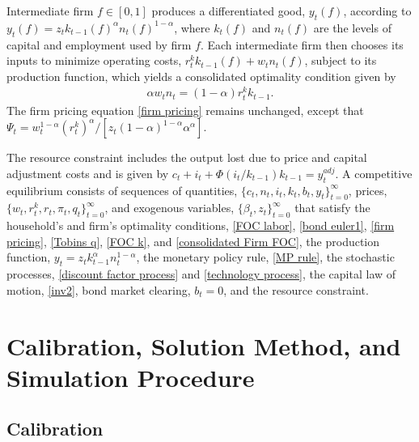 \documentclass[12pt,final]{article}
\begin{document}
Intermediate firm $f\in[0,1]$ produces a differentiated good, $y_t(f)$, according to $y_t(f)=z_tk_{t-1}(f)^{\alpha}n_t(f)^{1-\alpha}$, where $k_t(f)$ and $n_t(f)$ are the levels of capital and employment used by firm $f$. Each intermediate firm then chooses its inputs to minimize operating costs, $r_t^kk_{t-1}(f)+w_tn_t(f)$, subject to its production function, which yields a consolidated optimality condition given by
\begin{gather}
  \alpha w_tn_t = (1-\alpha)r_t^kk_{t-1}. \label{consolidated Firm FOC}
\end{gather}
The firm pricing equation \eqref{firm pricing} remains unchanged, except that $\Psi_t=w_t^{1-\alpha}(r_t^k)^{\alpha}/[z_t(1-\alpha)^{1-\alpha}\alpha^\alpha]$.

The resource constraint includes the output lost due to price and capital adjustment costs and is given by $c_t+i_t+\Phi(i_t/k_{t-1})k_{t-1}=y_t^{adj}$. A competitive equilibrium consists of sequences of quantities, $\{c_t,n_t,i_t,k_t,b_t,y_t\}_{t=0}^\infty$, prices, $\{w_t,r_t^k,r_t,\pi_t,q_t\}_{t=0}^\infty$, and exogenous variables, $\{\beta_t,z_t\}_{t=0}^\infty$ that satisfy the household's and firm's optimality conditions, \eqref{FOC labor}, \eqref{bond euler1}, \eqref{firm pricing}, \eqref{Tobins q}, \eqref{FOC k}, and \eqref{consolidated Firm FOC}, the production function, $y_t=z_tk_{t-1}^\alpha n_t^{1-\alpha}$, the monetary policy rule, \eqref{MP rule}, the stochastic processes, \eqref{discount factor process} and \eqref{technology process}, the capital law of motion, \eqref{inv2}, bond market clearing, $b_t=0$, and the resource constraint.

\section{Calibration, Solution Method, and Simulation Procedure}\label{sec:calibration}

\subsection{Calibration}
\end{document}

